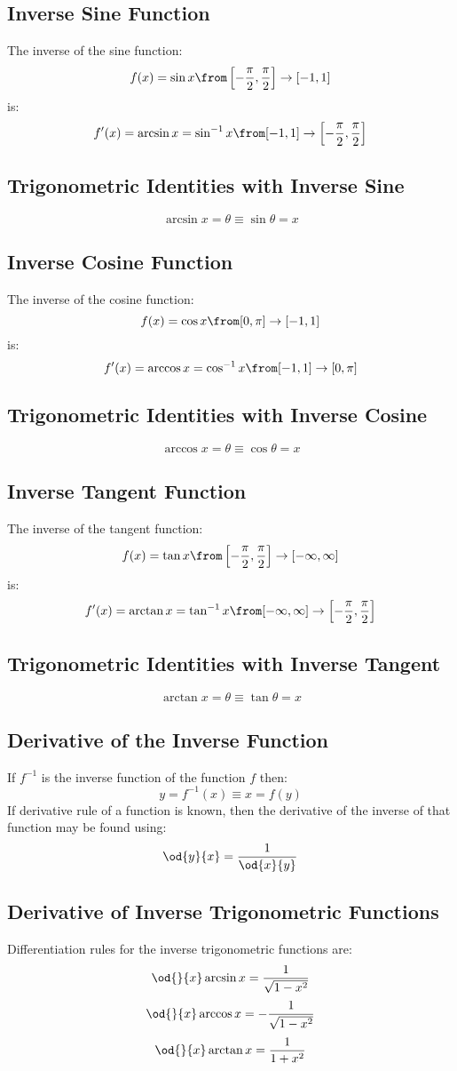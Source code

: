 \subsection{Inverse Sine Function}
	The inverse of the sine function:
	\[f(x) = \sin x \from \left[ -\frac{\pi}{2}, \frac{\pi}{2} \right] \to [-1,1]\]
	is:\
	\[f'(x) = \arcsin x = \sin^{-1} x \from [-1,1] \to \left[ -\frac{\pi}{2}, \frac{\pi}{2} \right]\]
\subsection{Trigonometric Identities with Inverse Sine}
	\[\arcsin x = \theta \equiv \sin \theta = x\]
\subsection{Inverse Cosine Function}
	The inverse of the cosine function:
	\[f(x) = \cos x \from [0, \pi] \to [-1,1]\]
	is:\
	\[f'(x) = \arccos x = \cos^{-1} x \from [-1,1] \to [0,\pi]\]
\subsection{Trigonometric Identities with Inverse Cosine}
	\[\arccos x = \theta \equiv \cos \theta = x\]
\subsection{Inverse Tangent Function}
	The inverse of the tangent function:
	\[f(x) = \tan x \from \left[ -\frac{\pi}{2}, \frac{\pi}{2} \right] \to [-\infty,\infty]\]
	is:\
	\[f'(x) = \arctan x = \tan^{-1} x \from [-\infty,\infty] \to \left[ -\frac{\pi}{2}, \frac{\pi}{2} \right]\]
\subsection{Trigonometric Identities with Inverse Tangent}
	\[\arctan x = \theta \equiv \tan \theta = x\]
\subsection{Derivative of the Inverse Function}
	If $f^{-1}$ is the inverse function of the function $f$ then:
	\[y = f^{-1}(x) \equiv x = f(y)\]
	If derivative rule of a function is known, then the derivative of the inverse of that function may be found using:
	\[\od{y}{x} = \frac{1}{\od{x}{y}}\]
\subsection{Derivative of Inverse Trigonometric Functions}
	Differentiation rules for the inverse trigonometric functions are:
	\[\od{}{x} \arcsin x = \frac{1}{\sqrt{1-x^2}}\]
	\[\od{}{x} \arccos x = -\frac{1}{\sqrt{1-x^2}}\]
	\[\od{}{x} \arctan x = \frac{1}{1+x^2}\]
